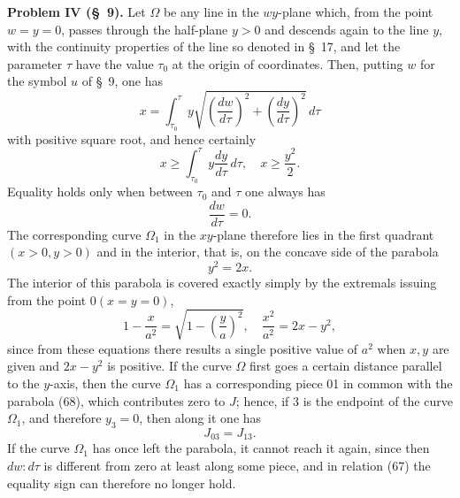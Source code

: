 \documentclass[11pt,a4paper,leqno]{article}
\begin{document}
\noindent\textbf{Problem IV (\S~9).} Let $\Omega$ be any line in the $wy$-plane which, from the point $w=y=0$, passes through the half-plane $y>0$ and descends again to the line $y$, with the continuity properties of the line so denoted in \S~17, and let the parameter $\tau$ have the value $\tau_0$ at the origin of coordinates. Then, putting $w$ for the symbol $u$ of \S~9, one has
\begin{equation}\tag{66}
x=\int_{\tau_0}^{\tau}
y\sqrt{\left(\frac{dw}{d\tau}\right)^2+\left(\frac{dy}{d\tau}\right)^2}\,d\tau
\end{equation}
with positive square root, and hence certainly
\begin{equation}\tag{67}
x\geq \int_{\tau_0}^{\tau}y\frac{dy}{d\tau}\,d\tau,\quad
x\geq \frac{y^2}{2}.
\end{equation}
Equality holds only when between $\tau_0$ and $\tau$ one always has
\[
\frac{dw}{d\tau}=0.
\]
The corresponding curve $\Omega_1$ in the $xy$-plane therefore lies in the first quadrant $(x>0,y>0)$ and in the interior, that is, on the concave side of the parabola
\begin{equation}\tag{68}
y^2=2x.
\end{equation}
The interior of this parabola is covered exactly simply by the extremals issuing from the point $0(x=y=0)$,
\begin{equation}\tag{69}
1-\frac{x}{a^2}
=
\sqrt{1-\left(\frac{y}{a}\right)^2},\quad
\frac{x^2}{a^2}=2x-y^2,
\end{equation}
since from these equations there results a single positive value of $a^2$ when $x,y$ are given and
$2x-y^2$ is positive. If the curve $\Omega$ first goes a certain distance parallel to the $y$-axis, then the curve $\Omega_1$ has a corresponding piece 01 in common with the parabola (68), which contributes zero to $J$; hence, if 3 is the endpoint of the curve $\Omega_1$, and therefore $y_3=0$, then along it one has
\begin{equation}\tag{70}
J_{03}=J_{13}.
\end{equation}
If the curve $\Omega_1$ has once left the parabola, it cannot reach it again, since then $dw:d\tau$ is different from zero at least along some piece, and in relation (67) the equality sign can therefore no longer hold.
\end{document}
